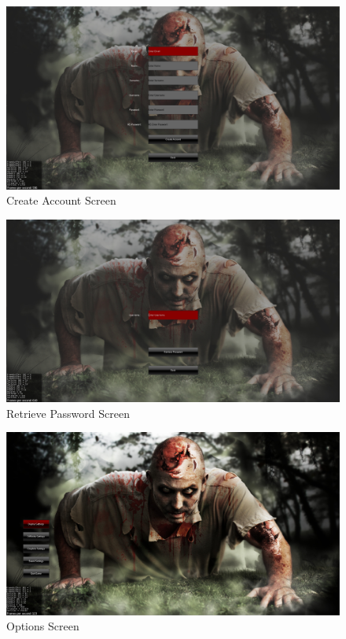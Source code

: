 \documentclass[letterpaper]{article}
\begin{document}
		
		\begin{figure}[H]
		\centering
		\includegraphics[width=130mm]{GUI_ScreenShots/CreateAccount.jpg}
		\caption{Create Account Screen}
		\end{figure}
		

			
		\begin{figure}[H]
		\centering
		\includegraphics[width=130mm]{GUI_ScreenShots/RetrievePassword.jpg}
		\caption{Retrieve Password Screen}
		\end{figure}
		
			
		\begin{figure}[H]
		\centering
		\includegraphics[width=130mm]{GUI_ScreenShots/OptionsScreen.jpg}
		\caption{Options Screen}
		\end{figure}
		
\end{document}
